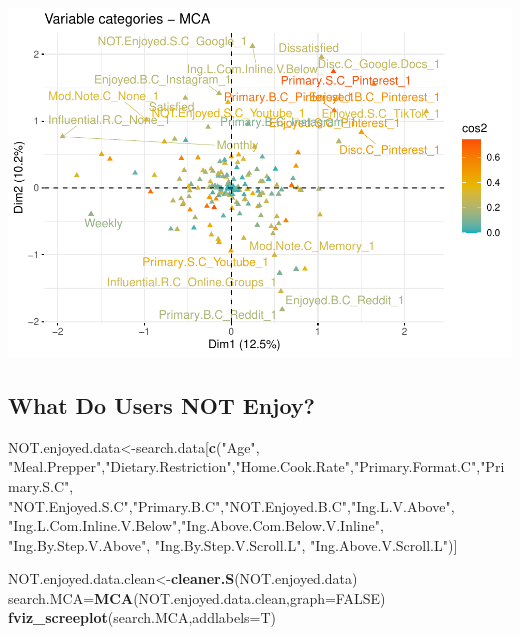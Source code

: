 \documentclass[
]{article}
\newenvironment{Shaded}{\begin{snugshade}}{\end{snugshade}}
\newcommand{\DataTypeTok}[1]{\textcolor[rgb]{0.13,0.29,0.53}{#1}}
\newcommand{\KeywordTok}[1]{\textcolor[rgb]{0.13,0.29,0.53}{\textbf{#1}}}
\newcommand{\NormalTok}[1]{#1}
\newcommand{\OtherTok}[1]{\textcolor[rgb]{0.56,0.35,0.01}{#1}}
\newcommand{\StringTok}[1]{\textcolor[rgb]{0.31,0.60,0.02}{#1}}
\begin{document}
\includegraphics{Average-User-MCA_files/figure-latex/mca enjoyed all-3.pdf}

\hypertarget{what-do-users-not-enjoy}{%
\subsection{What Do Users NOT Enjoy?}\label{what-do-users-not-enjoy}}

\begin{Shaded}
\begin{Highlighting}[]
\NormalTok{NOT.enjoyed.data<-search.data[}\KeywordTok{c}\NormalTok{(}\StringTok{"Age"}\NormalTok{, }\StringTok{"Meal.Prepper"}\NormalTok{,}\StringTok{"Dietary.Restriction"}\NormalTok{,}\StringTok{"Home.Cook.Rate"}\NormalTok{,}\StringTok{"Primary.Format.C"}\NormalTok{,}\StringTok{"Primary.S.C"}\NormalTok{,}
            \StringTok{"NOT.Enjoyed.S.C"}\NormalTok{,}\StringTok{"Primary.B.C"}\NormalTok{,}\StringTok{"NOT.Enjoyed.B.C"}\NormalTok{,}\StringTok{"Ing.L.V.Above"}\NormalTok{,}
            \StringTok{"Ing.L.Com.Inline.V.Below"}\NormalTok{,}\StringTok{"Ing.Above.Com.Below.V.Inline"}\NormalTok{,  }\StringTok{"Ing.By.Step.V.Above"}\NormalTok{,  }\StringTok{"Ing.By.Step.V.Scroll.L"}\NormalTok{,}
            \StringTok{"Ing.Above.V.Scroll.L"}\NormalTok{)]}

\NormalTok{NOT.enjoyed.data.clean<-}\KeywordTok{cleaner.S}\NormalTok{(NOT.enjoyed.data)}
\NormalTok{search.MCA=}\KeywordTok{MCA}\NormalTok{(NOT.enjoyed.data.clean,}\DataTypeTok{graph=}\OtherTok{FALSE}\NormalTok{)}
\KeywordTok{fviz_screeplot}\NormalTok{(search.MCA,}\DataTypeTok{addlabels=}\NormalTok{T)}
\end{Highlighting}
\end{Shaded}
\end{document}
